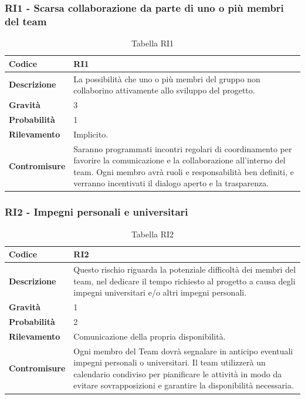 \documentclass{article}
\begin{document}
    \subsubsection{RI1 - Scarsa collaborazione da parte di uno o più membri del team}
    \begin{table}[H]
        \renewcommand{\arraystretch}{1.5}
        \centering
        \begin{tabular}{|p{3cm}|p{11cm}|}
            \hline
            \textbf{Codice} & RI1 \\
            \hline
            \textbf{Descrizione} & La possibilità che uno o più membri del gruppo non collaborino attivamente allo sviluppo del progetto. \\
            \hline
            \textbf{Gravità} & 3 \\
            \hline
            \textbf{Probabilità} & 1 \\
            \hline
            \textbf{Rilevamento} & Implicito. \\
            \hline
            \textbf{Contromisure} & Saranno programmati incontri regolari di coordinamento per favorire la comunicazione e la collaborazione all’interno del team. Ogni membro avrà ruoli e responsabilità ben definiti, e verranno incentivati il dialogo aperto e la trasparenza. \\
            \hline
        \end{tabular}
        \caption{Tabella RI1}
    \end{table}

    \subsubsection{RI2 - Impegni personali e universitari }
    \begin{table}[H]
        \renewcommand{\arraystretch}{1.5}
        \centering
        \begin{tabular}{|p{3cm}|p{11cm}|}
            \hline
            \textbf{Codice} & RI2 \\
            \hline
            \textbf{Descrizione} & Questo rischio riguarda la potenziale difficoltà dei membri del team, nel dedicare il tempo richiesto al progetto a causa degli impegni universitari e/o altri impegni personali. \\
            \hline
            \textbf{Gravità} & 1 \\
            \hline
            \textbf{Probabilità} & 2 \\
            \hline
            \textbf{Rilevamento} & Comunicazione della propria disponibilità. \\
            \hline
            \textbf{Contromisure} & Ogni membro del Team dovrà segnalare in anticipo eventuali impegni personali o universitari. Il team utilizzerà un calendario condiviso per pianificare le attività in modo da evitare sovrapposizioni e garantire la disponibilità necessaria. \\
            \hline
        \end{tabular}
        \caption{Tabella RI2}
    \end{table}
\end{document}
